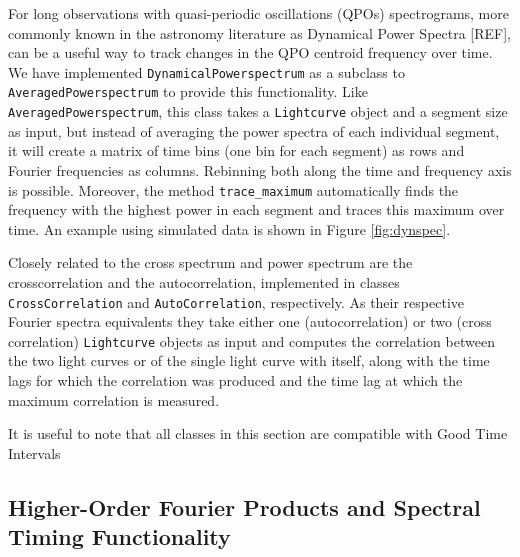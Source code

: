 \documentclass[12pt]{emulateapj}
\newcommand{\lightcurve}{\texttt{Lightcurve}\xspace}
\begin{document}
For long observations with quasi-periodic oscillations (QPOs) spectrograms, more commonly known in the astronomy literature as Dynamical Power Spectra [REF], can be a useful way to track changes in the QPO centroid frequency over time. We have implemented \texttt{DynamicalPowerspectrum} as a subclass to \texttt{AveragedPowerspectrum} to provide this functionality. Like \texttt{AveragedPowerspectrum}, this class takes a \lightcurve object and a segment size as input, but instead of averaging the power spectra of each individual segment, it will create a matrix of time bins (one bin for each segment) as rows and Fourier frequencies as columns. Rebinning both along the time and frequency axis is possible. Moreover, the method \texttt{trace_maximum} automatically finds the frequency with the highest 
power in each segment and traces this maximum over time. An example using simulated data is shown in Figure \ref{fig:dynspec}.

Closely related to the cross spectrum and power spectrum are the crosscorrelation and the autocorrelation, implemented in classes \texttt{CrossCorrelation} and \texttt{AutoCorrelation}, respectively. As their respective Fourier spectra equivalents they take either one (autocorrelation) or two (cross correlation) \lightcurve objects as input and computes the correlation between the two light curves or of the single light curve with itself, along with the time lags for which the correlation was produced and the time lag at which the maximum correlation is measured.

It is useful to note that all classes in this section are compatible with Good Time Intervals



\subsection{Higher-Order Fourier Products and Spectral Timing Functionality}
\label{sec:fourier_others}
\end{document}
